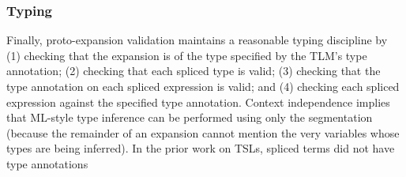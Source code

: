 \documentclass[acmsmall,review,anonymous]{acmart}\settopmatter{printfolios=true,printccs=false,printacmref=false}
\newcommand{\li}[1]{\lstinline[basicstyle=\ttfamily\fontsize{9pt}{1em}\selectfont]{#1}}
\begin{document}
\subsubsection{Typing}\label{sec:typing-e}
Finally, proto-expansion validation maintains a reasonable {typing discipline} by (1) checking that the expansion is of the type specified by the TLM's type annotation; (2) checking that each spliced type is valid; (3) checking that the type annotation on each spliced expression is valid; and (4) checking each spliced expression against the specified type annotation. Context independence implies that ML-style type inference can be performed using only the segmentation (because the remainder of an expansion cannot mention the very variables whose types are being inferred). In the prior work on TSLs, spliced terms did not have type annotations 

\end{document}

